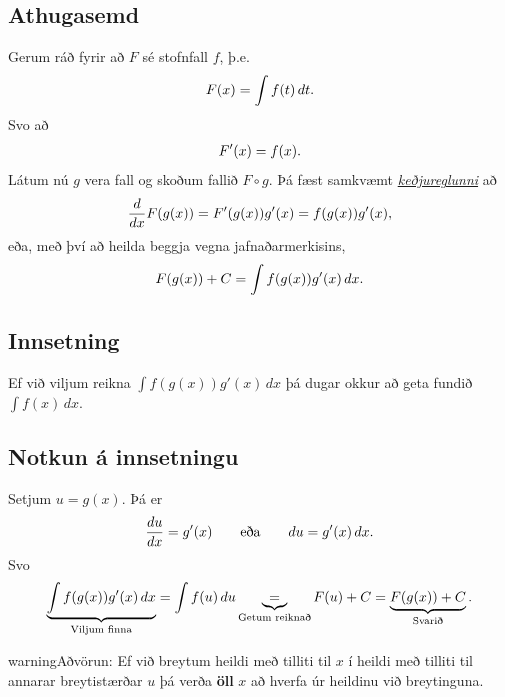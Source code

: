 \documentclass[a4paper,10pt,icelandic]{sphinxmanual}
\begin{document}
\subsection{Athugasemd}
\label{kafli06:athugasemd}
Gerum ráð fyrir að \(F\) sé stofnfall \(f\), þ.e.
\begin{gather}
\begin{split}F(x)=\int f(t)\,dt.\end{split}\notag
\end{gather}
Svo að
\begin{gather}
\begin{split}F'(x)=f(x).\end{split}\notag
\end{gather}
Látum nú \(g\) vera fall og skoðum fallið \(F\circ g\). Þá fæst
samkvæmt {\hyperref[kafli03:kedjuregla]{\emph{keðjureglunni}}} að
\begin{gather}
\begin{split}\frac{d}{dx}F(g(x))=F'(g(x))g'(x) = f(g(x))g'(x),\end{split}\notag
\end{gather}
eða, með því að heilda beggja vegna jafnaðarmerkisins,
\begin{gather}
\begin{split}F(g(x))+C = \int f(g(x))g'(x)\,dx.\end{split}\notag
\end{gather}

\subsection{Innsetning}
\label{kafli06:index-9}\label{kafli06:innsetning}
Ef við viljum reikna \(\int f(g(x))g'(x)\, dx\) þá dugar okkur að
geta fundið \(\int f(x)\, dx\).


\subsection{Notkun á innsetningu}
\label{kafli06:notkun-a-innsetningu}
Setjum \(u=g(x)\). Þá er
\begin{gather}
\begin{split}\frac{du}{dx}=g'(x)\qquad \text{eða} \qquad du=g'(x)\,dx.\end{split}\notag
\end{gather}
Svo
\begin{gather}
\begin{split}\underbrace{\int f(g(x))g'(x)\,dx}_{\text{Viljum finna}}  =
\int f(u)\,du
\underbrace{=}_{\text{Getum reiknað}} F(u)+C  =
\underbrace{F(g(x))+C}_{\text{Svarið}}.\end{split}\notag
\end{gather}
\begin{notice}{warning}{Aðvörun:}
Ef við breytum heildi með tilliti til \(x\) í heildi með tilliti til
annarar breytistærðar \(u\) þá verða \textbf{öll} \(x\) að hverfa úr
heildinu við breytinguna.
\end{notice}
\end{document}
